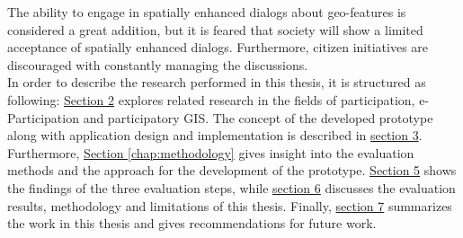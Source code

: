 The ability to engage in spatially enhanced dialogs about geo-features is considered a great addition, but it is feared that society will show a limited acceptance of spatially enhanced dialogs.
Furthermore, citizen initiatives are discouraged with constantly managing the discussions.\\
In order to describe the research performed in this thesis, it is structured as following: \hyperref[chap:related_work]{Section 2} explores related research in the fields of participation, e-Participation and participatory GIS. The concept of the developed prototype along with application design and implementation is described in \hyperref[chap:approach]{section 3}. Furthermore, \hyperref[chap:methodology]{Section \ref{chap:methodology}} gives insight into the evaluation methods and the approach for the development of the prototype. \hyperref[chap:methodology]{Section 5} shows the findings of the three evaluation steps, while \hyperref[chap:discussion]{section 6} discusses the evaluation results, methodology and limitations of this thesis. Finally, \hyperref[chap:conclusion]{section 7} summarizes the work in this thesis and gives recommendations for future work.
